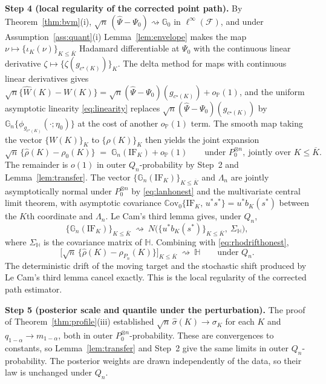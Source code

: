 \documentclass[11pt]{article}
\newcommand{\Pp}{\mathbb P}
\newcommand{\G}{\mathbb G}
\newcommand{\Cov}{\mathbb C\mathrm{ov}}
\newcommand{\opro}{o_{\Pp}}
\newcommand{\dto}{\rightsquigarrow}
\newcommand{\calF}{\mathcal F}
\newcommand{\hPsi}{\widehat\Psi}
\begin{document}
\textbf{Step 4 (local regularity of the corrected point path).} By Theorem~\ref{thm:bvm}(i), $\sqrt n\,(\hPsi-\Psi_0)\dto\G_0$ in $\ell^\infty(\calF)$, and under Assumption~\ref{ass:quant}\textup{(i)} Lemma~\ref{lem:envelope} makes the map $\nu\mapsto\{\iota_K(\nu)\}_{K\le\overline K}$ Hadamard differentiable at $\Psi_0$ with the continuous linear derivative $\zeta\mapsto\{\zeta(g_{c^\star(K)})\}_K$. The delta method for maps with continuous linear derivatives \citep[Theorem~3.9.4]{vdvwellner1996} gives $\sqrt n\{\widehat W(K)-W(K)\}=\sqrt n(\hPsi-\Psi_0)(g_{c^\star(K)})+\opro(1)$, and the uniform asymptotic linearity \eqref{eq:linearity} replaces $\sqrt n(\hPsi-\Psi_0)(g_{c^\star(K)})$ by $\G_n\{\phi_{g_{c^\star(K)}}(\cdot;\eta_0)\}$ at the cost of another $\opro(1)$ term. The smooth map taking the vector $\{W(K)\}_K$ to $\{\rho(K)\}_K$ then yields the joint expansion
\begin{equation*}
\sqrt n\,\{\hat\rho(K)-\rho_0(K)\}\;=\;\G_n(\mathrm{IF}_K)+\opro(1)
\qquad\text{under }P_0^{\otimes n},\ \text{jointly over }K\le\overline K.
\end{equation*}
The remainder is $o(1)$ in outer $Q_n$-probability by Step~2 and Lemma~\ref{lem:transfer}. The vector $\{\G_n(\mathrm{IF}_K)\}_{K\le\overline K}$ and $\Lambda_n$ are jointly asymptotically normal under $P_0^{\otimes n}$ by \eqref{eq:lanhonest} and the multivariate central limit theorem, with asymptotic covariance $\Cov_0\{\mathrm{IF}_K,\,u^\ast s^\ast\}=u^\ast b_K(s^\ast)$ between the $K$th coordinate and $\Lambda_n$. Le Cam's third lemma \citep[Example~6.7]{vandervaart1998} gives, under $Q_n$,
\begin{equation*}
\{\G_n(\mathrm{IF}_K)\}_{K\le\overline K}\ \dto\ N\bigl(\{u^\ast b_K(s^\ast)\}_{K\le\overline K},\ \Sigma_{\mathbb H}\bigr),
\end{equation*}
where $\Sigma_{\mathbb H}$ is the covariance matrix of $\mathbb H$. Combining with \eqref{eq:rhodrifthonest},
\begin{equation}\label{eq:regularityhonest}
\bigl[\sqrt n\,\{\hat\rho(K)-\rho_{P_n}(K)\}\bigr]_{K\le\overline K}\ \dto\ \mathbb H
\qquad\text{under }Q_n .
\end{equation}
The deterministic drift of the moving target and the stochastic shift produced by Le Cam's third lemma cancel exactly. This is the local regularity of the corrected path estimator.

\textbf{Step 5 (posterior scale and quantile under the perturbation).} The proof of Theorem~\ref{thm:profile}(iii) established $\sqrt n\,\hat\sigma(K)\to\sigma_K$ for each $K$ and $q_{1-\alpha}\to m_{1-\alpha}$, both in outer $P_0^{\otimes n}$-probability. These are convergences to constants, so Lemma~\ref{lem:transfer} and Step~2 give the same limits in outer $Q_n$-probability. The posterior weights are drawn independently of the data, so their law is unchanged under $Q_n$.
\end{document}
